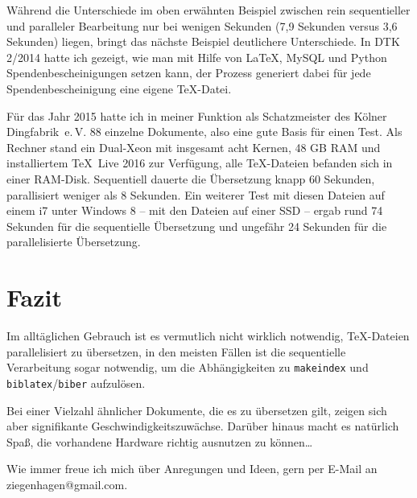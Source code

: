 \documentclass{dtk}
\begin{document}
Während die Unterschiede im oben erwähnten Beispiel zwischen rein sequentieller und paralleler Bearbeitung nur bei wenigen Sekunden (7,9 Sekunden versus 3,6 Sekunden) liegen, bringt das nächste Beispiel deutlichere Unterschiede. In DTK 2/2014 hatte ich gezeigt, wie man mit Hilfe von \LaTeX, MySQL und Python Spendenbescheinigungen setzen kann, der Prozess generiert dabei für jede Spendenbescheinigung eine eigene \TeX-Datei.

Für das Jahr 2015 hatte ich in meiner Funktion als Schatzmeister des Kölner Dingfabrik~e.\,V. 88 einzelne Dokumente, also eine gute Basis für einen Test. Als Rechner stand ein Dual-Xeon mit insgesamt acht Kernen, 48 GB RAM und installiertem \TeX~Live 2016 zur Verfügung, alle \TeX-Dateien befanden sich in einer RAM-Disk. Sequentiell dauerte die Übersetzung knapp 60 Sekunden, parallisiert weniger als 8 Sekunden. Ein weiterer Test mit diesen Dateien auf einem i7 unter Windows 8 -- mit den Dateien auf einer SSD -- ergab rund 74 Sekunden für die sequentielle Übersetzung und ungefähr 24 Sekunden für die parallelisierte Übersetzung.

\section{Fazit}

Im alltäglichen Gebrauch ist es vermutlich nicht wirklich notwendig, \TeX-Dateien parallelisiert zu übersetzen, in den meisten Fällen ist die sequentielle Verarbeitung sogar notwendig, um die Abhängigkeiten zu \texttt{makeindex} und \texttt{biblatex}/\texttt{biber} aufzulösen.

Bei einer Vielzahl ähnlicher Dokumente, die es zu übersetzen gilt, zeigen sich aber signifikante Geschwindigkeitszuwächse. Darüber hinaus macht es natürlich Spaß, die vorhandene Hardware richtig ausnutzen zu können\ldots

Wie immer freue ich mich über Anregungen und Ideen, gern per E-Mail an ziegenhagen@gmail.com.
\end{document}
